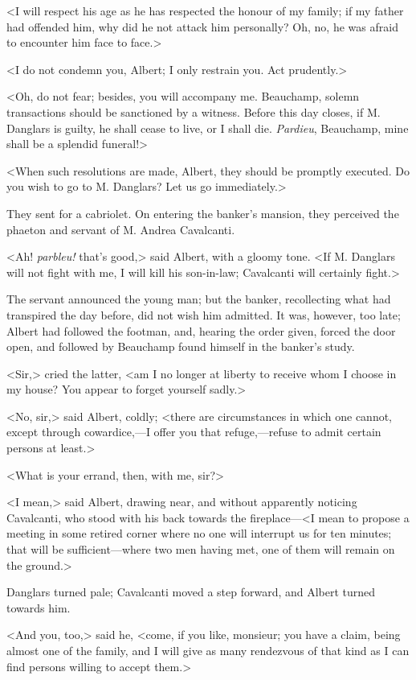  <I will respect his age as he has respected the honour of my family; if my father had offended him, why did he not attack him personally? Oh, no, he was afraid to encounter him face to face.> 

 <I do not condemn you, Albert; I only restrain you. Act prudently.> 

 <Oh, do not fear; besides, you will accompany me. Beauchamp, solemn transactions should be sanctioned by a witness. Before this day closes, if M. Danglars is guilty, he shall cease to live, or I shall die. \textit{Pardieu}, Beauchamp, mine shall be a splendid funeral!> 

 <When such resolutions are made, Albert, they should be promptly executed. Do you wish to go to M. Danglars? Let us go immediately.> 

 They sent for a cabriolet. On entering the banker's mansion, they perceived the phaeton and servant of M. Andrea Cavalcanti. 

 <Ah! \textit{parbleu!} that's good,> said Albert, with a gloomy tone. <If M. Danglars will not fight with me, I will kill his son-in-law; Cavalcanti will certainly fight.> 

 The servant announced the young man; but the banker, recollecting what had transpired the day before, did not wish him admitted. It was, however, too late; Albert had followed the footman, and, hearing the order given, forced the door open, and followed by Beauchamp found himself in the banker's study. 

 <Sir,> cried the latter, <am I no longer at liberty to receive whom I choose in my house? You appear to forget yourself sadly.> 

 <No, sir,> said Albert, coldly; <there are circumstances in which one cannot, except through cowardice,—I offer you that refuge,—refuse to admit certain persons at least.> 

 <What is your errand, then, with me, sir?> 

 <I mean,> said Albert, drawing near, and without apparently noticing Cavalcanti, who stood with his back towards the fireplace—<I mean to propose a meeting in some retired corner where no one will interrupt us for ten minutes; that will be sufficient—where two men having met, one of them will remain on the ground.> 

 Danglars turned pale; Cavalcanti moved a step forward, and Albert turned towards him. 

 <And you, too,> said he, <come, if you like, monsieur; you have a claim, being almost one of the family, and I will give as many rendezvous of that kind as I can find persons willing to accept them.> 

